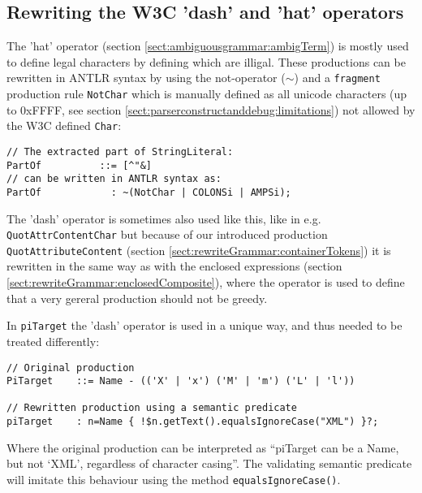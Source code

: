 \subsection{Rewriting the W3C 'dash' and 'hat' operators}
The 'hat' operator (section \ref{sect:ambiguousgrammar:ambigTerm}) is mostly used to define legal characters by defining which are illigal. These productions can be rewritten in ANTLR syntax by using the not-operator ($\sim$) and a \verb!fragment! production rule \verb!NotChar! which is manually defined as all unicode characters (up to 0xFFFF, see section \ref{sect:parserconstructanddebug:limitations}) not allowed by the W3C defined \verb!Char!:
\begin{verbatim}
// The extracted part of StringLiteral:
PartOf          ::= [^"&]
// can be written in ANTLR syntax as:
PartOf            : ~(NotChar | COLONSi | AMPSi);
\end{verbatim}
The 'dash' operator is sometimes also used like this, like in e.g. \verb!QuotAttrContentChar! but because of our introduced production \verb!QuotAttributeContent! (section \ref{sect:rewriteGrammar:containerTokens}) it is rewritten in the same way as with the enclosed expressions (section \ref{sect:rewriteGrammar:enclosedComposite}), where the operator is used to define that a very gereral production should not be greedy. 

In \verb!piTarget! the 'dash' operator is used in a unique way, and thus needed to be treated differently:
\begin{verbatim}
// Original production
PiTarget    ::= Name - (('X' | 'x') ('M' | 'm') ('L' | 'l'))

// Rewritten production using a semantic predicate
piTarget    : n=Name { !$n.getText().equalsIgnoreCase("XML") }?;
\end{verbatim}
Where the original production can be interpreted as ``piTarget can be a Name, but not `XML', regardless of character casing''. The validating semantic predicate will imitate this behaviour using the method \verb!equalsIgnoreCase()!.

